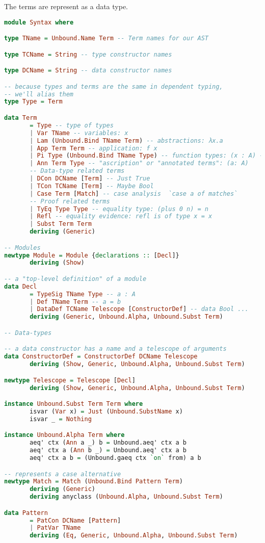 \documentclass[
       embeddedlogo,
       english,
       lmodern,
       coorientadorbanca,
       noabntexcite
]{ufsc-thesis-rn46-2019}
\theoremstyle{definition}
\begin{document}
The terms are represent as a data type.

\begin{lstlisting}[language=Haskell]
module Syntax where

type TName = Unbound.Name Term -- Term names for our AST

type TCName = String -- type constructor names

type DCName = String -- data constructor names

-- because types and terms are the same in dependent typing,
-- we'll alias them
type Type = Term

data Term
       = Type -- type of types
       | Var TName -- variables: x
       | Lam (Unbound.Bind TName Term) -- abstractions: λx.a
       | App Term Term -- application: f x
       | Pi Type (Unbound.Bind TName Type) -- function types: (x : A) -> B
       | Ann Term Type -- "ascription" or "annotated terms": (a: A)
       -- Data-type related terms
       | DCon DCName [Term] -- Just True
       | TCon TCName [Term] -- Maybe Bool
       | Case Term [Match] -- case analysis  `case a of matches`
       -- Proof related terms
       | TyEq Type Type -- equality type: (plus 0 n) = n
       | Refl -- equality evidence: refl is of type x = x
       | Subst Term Term
       deriving (Generic)

-- Modules
newtype Module = Module {declarations :: [Decl]}
       deriving (Show)

-- a "top-level definition" of a module
data Decl
       = TypeSig TName Type -- a : A
       | Def TName Term -- a = b
       | DataDef TCName Telescope [ConstructorDef] -- data Bool ...
       deriving (Generic, Unbound.Alpha, Unbound.Subst Term)

-- Data-types

-- a data constructor has a name and a telescope of arguments
data ConstructorDef = ConstructorDef DCName Telescope
       deriving (Show, Generic, Unbound.Alpha, Unbound.Subst Term)

newtype Telescope = Telescope [Decl]
       deriving (Show, Generic, Unbound.Alpha, Unbound.Subst Term)

instance Unbound.Subst Term Term where
       isvar (Var x) = Just (Unbound.SubstName x)
       isvar _ = Nothing

instance Unbound.Alpha Term where
       aeq' ctx (Ann a _) b = Unbound.aeq' ctx a b
       aeq' ctx a (Ann b _) = Unbound.aeq' ctx a b
       aeq' ctx a b = (Unbound.gaeq ctx `on` from) a b

-- represents a case alternative
newtype Match = Match (Unbound.Bind Pattern Term)
       deriving (Generic)
       deriving anyclass (Unbound.Alpha, Unbound.Subst Term)

data Pattern
       = PatCon DCName [Pattern]
       | PatVar TName
       deriving (Eq, Generic, Unbound.Alpha, Unbound.Subst Term)
\end{lstlisting}
\end{document}
